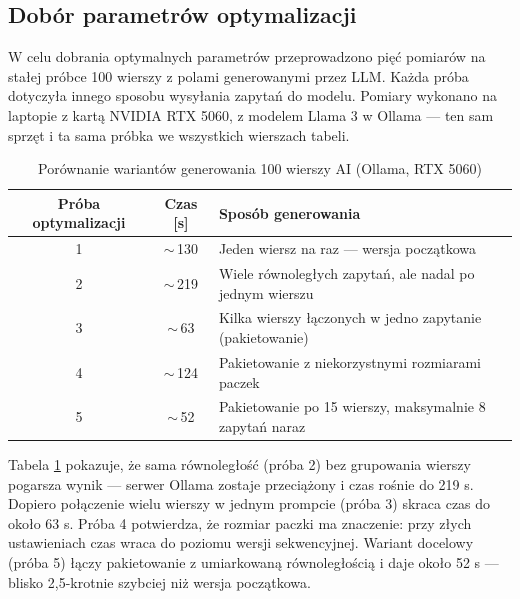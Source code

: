 \subsection*{Dobór parametrów optymalizacji}
W celu dobrania optymalnych parametrów przeprowadzono pięć pomiarów na stałej próbce 100 wierszy z polami generowanymi przez \gls{LLM}. Każda próba dotyczyła innego sposobu wysyłania zapytań do modelu. Pomiary wykonano na laptopie z kartą NVIDIA RTX 5060, z modelem Llama 3 w Ollama --- ten sam sprzęt i ta sama próbka we wszystkich wierszach tabeli.

\begin{table}[H]
    \centering
    \begin{tabular}{|c|c|p{7cm}|}
        \hline
        \textbf{Próba optymalizacji} & \textbf{Czas [s]} & \textbf{Sposób generowania}                              \\
        \hline
        1                            & $\sim$\,130       & Jeden wiersz na raz --- wersja początkowa                \\
        \hline
        2                            & $\sim$\,219       & Wiele równoległych zapytań, ale nadal po jednym wierszu  \\
        \hline
        3                            & $\sim$\,63        & Kilka wierszy łączonych w jedno zapytanie (pakietowanie) \\
        \hline
        4                            & $\sim$\,124       & Pakietowanie z niekorzystnymi rozmiarami paczek          \\
        \hline
        5                            & $\sim$\,52        & Pakietowanie po 15 wierszy, maksymalnie 8 zapytań naraz  \\
        \hline
    \end{tabular}
    \caption{Porównanie wariantów generowania 100 wierszy AI (Ollama, RTX 5060)}
    \label{tab:llm_optimization_100}
\end{table}

Tabela \ref{tab:llm_optimization_100} pokazuje, że sama równoległość (próba 2) bez grupowania wierszy pogarsza wynik --- serwer Ollama zostaje przeciążony i czas rośnie do 219 s. Dopiero połączenie wielu wierszy w jednym prompcie (próba 3) skraca czas do około 63 s. Próba 4 potwierdza, że rozmiar paczki ma znaczenie: przy złych ustawieniach czas wraca do poziomu wersji sekwencyjnej. Wariant docelowy (próba 5) łączy pakietowanie z umiarkowaną równoległością i daje około 52 s --- blisko 2,5-krotnie szybciej niż wersja początkowa.

